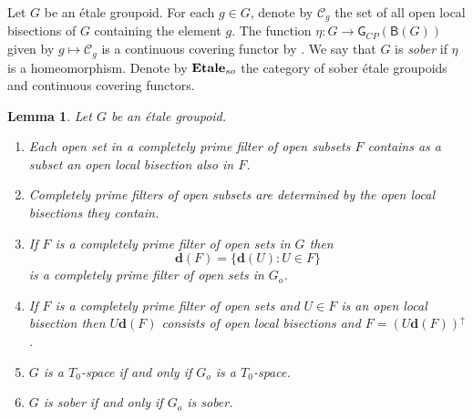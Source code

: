 \documentclass[a4paper]{amsart}
\newtheorem{lemma}[theorem]{Lemma}
\begin{document}
Let $G$ be an \'etale groupoid.
For each $g \in G$, denote by $\mathscr{C}_{g}$ the set of all open local bisections of $G$ containing the element $g$.
The function $\eta \colon G \rightarrow \mathsf{G}_{CP}(\mathsf{B}(G))$ given by $g \mapsto \mathscr{C}_{g}$
is a continuous covering functor by \cite[Proposition 2.11]{LL}.
We say that $G$ is {\em sober} if $\eta$ is a homeomorphism.
Denote by $\mbox{\bf Etale}_{so}$ the category of sober \'etale groupoids and continuous covering functors.
 
\begin{lemma}\label{lem:sober} Let $G$ be an \'etale groupoid.
\begin{enumerate}
\item Each open set in a completely prime filter of open subsets $F$ contains as a subset an open local bisection also in $F$.
\item Completely prime filters of open subsets are determined by the open local bisections they contain.
\item If $F$ is a completely prime filter of open sets in $G$ then 
$$\mathbf{d}(F) = \{ \mathbf{d}(U) \colon U \in F\}$$
is a completely prime filter of open sets in $G_{o}$.
\item If $F$ is a completely prime filter of open sets and $U \in F$ is an open local bisection
then $U\mathbf{d}(F)$ consists of open local bisections and $F = (U\mathbf{d}(F))^{\uparrow}$.
\item $G$ is a $T_{0}$-space if and only if $G_{o}$ is a $T_{0}$-space.
\item $G$ is sober if and only if $G_{o}$ is sober.
\end{enumerate}
\end{lemma}
\end{document}
